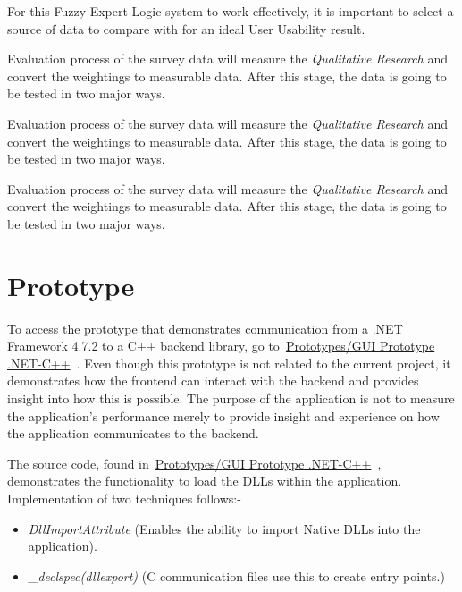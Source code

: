 \documentclass[12pt]{report} %
\begin{document}
	For this Fuzzy Expert Logic system to work effectively, it is important to select a source of data to compare with for an ideal User Usability result. 
		
	Evaluation process of the survey data will measure the \textit{Qualitative Research} and convert the weightings to measurable data. After this stage, the data is going to be tested in two major ways.

	Evaluation process of the survey data will measure the \textit{Qualitative Research} and convert the weightings to measurable data. After this stage, the data is going to be tested in two major ways.

	Evaluation process of the survey data will measure the \textit{Qualitative Research} and convert the weightings to measurable data. After this stage, the data is going to be tested in two major ways.

\chapter{Prototype}
\label{chap:prototype}
	To access the prototype that demonstrates communication from a .NET Framework 4.7.2 to a C++ backend library, go to~\href{https://github.com/ShinkuKira21/VisualPro-FinalProject/tree/main/Prototypes/GUI%20Concept%20.NET-C%2B%2B/Package}{Prototypes/GUI Prototype .NET-C++}~\cite{patch_visualpro_2022}. Even though this prototype is not related to the current project, it demonstrates how the frontend can interact with the backend and provides insight into how this is possible. The purpose of the application is not to measure the application's performance merely to provide insight and experience on how the application communicates to the backend.

	The source code, found in~\href{https://github.com/ShinkuKira21/VisualPro-FinalProject/tree/main/Prototypes/GUI%20Concept%20.NET-C%2B%2B/Source%20Code}{Prototypes/GUI Prototype .NET-C++}~\cite{patch_visualpro_2022}, demonstrates the functionality to load the DLLs within the application. Implementation of two techniques follows:-
	\begin{itemize}
		\item \textit{DllImportAttribute} (Enables the ability to import Native DLLs into the application).
		\item \textit{\_declspec(dllexport)} (C communication files use this to create entry points.)
	\end{itemize}
\end{document}
